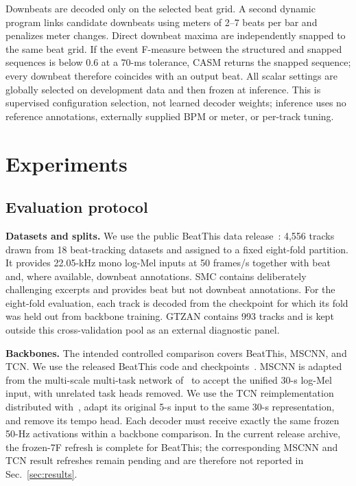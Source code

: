 \documentclass{article}
\begin{document}
Downbeats are decoded only on the selected beat grid. A second dynamic program links candidate downbeats using meters of 2--7 beats per bar and penalizes meter changes. Direct downbeat maxima are independently snapped to the same beat grid. If the event F-measure between the structured and snapped sequences is below $0.6$ at a $70$-ms tolerance, CASM returns the snapped sequence; every downbeat therefore coincides with an output beat. All scalar settings are globally selected on development data and then frozen at inference. This is supervised configuration selection, not learned decoder weights; inference uses no reference annotations, externally supplied BPM or meter, or per-track tuning.

\section{Experiments}\label{sec:exp}

\subsection{Evaluation protocol}
\textbf{Datasets and splits.} We use the public BeatThis data release~\cite{foscarin2024beat}: 4,556 tracks drawn from 18 beat-tracking datasets and assigned to a fixed eight-fold partition. It provides 22.05-kHz mono log-Mel inputs at 50 frames/s together with beat and, where available, downbeat annotations. SMC contains deliberately challenging excerpts and provides beat but not downbeat annotations. For the eight-fold evaluation, each track is decoded from the checkpoint for which its fold was held out from backbone training. GTZAN contains 993 tracks and is kept outside this cross-validation pool as an external diagnostic panel.

\textbf{Backbones.} The intended controlled comparison covers BeatThis, MSCNN, and TCN. We use the released BeatThis code and checkpoints~\cite{foscarin2024beat}. MSCNN is adapted from the multi-scale multi-task network of~\cite{he2026dynest} to accept the unified 30-s log-Mel input, with unrelated task heads removed. We use the TCN reimplementation distributed with~\cite{he2026dynest}, adapt its original 5-s input to the same 30-s representation, and remove its tempo head. Each decoder must receive exactly the same frozen 50-Hz activations within a backbone comparison. In the current release archive, the frozen-7F refresh is complete for BeatThis; the corresponding MSCNN and TCN result refreshes remain pending and are therefore not reported in Sec.~\ref{sec:results}.
\end{document}
